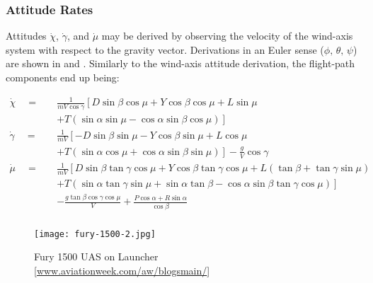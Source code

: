 \documentclass[12pt]{ucthesis}
\begin{document}
\subsubsection{Attitude Rates}
\label{subsubsec: att}
%
Attitudes $\dot{\chi}$, $\dot{\gamma}$, and $\dot{\mu}$ may be derived by observing the velocity of the wind-axis system with respect to the gravity vector. Derivations in an Euler sense ($\phi,\,\theta,\,\psi$) are shown in \citet[Pg. 222]{McRuer1973} and \citet[Sec. 1.2.3]{Duke1988}. Similarly to the wind-axis attitude derivation, the flight-path components end up being:

\begin{align*}
	\dot{\chi} \quad=\quad	& \frac{1}{mV\cos\gamma}\left[ D\sin\beta\cos\mu + Y\cos\beta\cos\mu + L\sin\mu \right.\\
	 												& +\left. T\left(\sin\alpha\sin\mu - \cos\alpha\sin\beta\cos\mu \right) \right] \\
	\dot{\gamma} \quad=\quad& \frac{1}{mV}\left[-D\sin\beta\sin\mu - Y\cos\beta\sin\mu + L\cos\mu \right.\\
														& +\left. T\left(\sin\alpha\cos\mu + \cos\alpha\sin\beta\sin\mu\right)\right] - \frac{g}{V}\cos\gamma \\
	\dot{\mu} \quad=\quad	& \frac{1}{mV}\left[D\sin\beta\tan\gamma\cos\mu + Y\cos\beta\tan\gamma\cos\mu + L\left(\tan\beta + \tan\gamma\sin\mu\right) \right.  \\
													& +\left. T\left(\sin\alpha\tan\gamma\sin\mu + \sin\alpha\tan\beta - \cos\alpha\sin\beta\tan\gamma\cos\mu\right)\right] \\
													& -\frac{g\tan\beta\cos\gamma\cos\mu}{V} + \frac{P\cos\alpha + R\sin\alpha}{\cos\beta}  \\
\end{align*}
%
\begin{figure}[H]%
	\centering%
	\texttt{[image: fury-1500-2.jpg]}%
	\caption{Fury 1500 UAS on Launcher [\href{http://www.aviationweek.com/aw/blogs/defense/index.jsp?plckController=Blog\&plckBlogPage=BlogViewPost\&newspaperUserId=27ec4a53-dcc8-42d0-bd3a-01329aef79a7\&plckPostId=Blog\%3a27ec4a53-dcc8-42d0-bd3a-01329aef79a7Post\%3ad7b30f2c-a25b-4f47-90e5-46ff5606094c\&plckScript=blogScript\&plckElementId=blogDest}{www.aviationweek.com/aw/blogsmain/}]}%
	\label{fig: fury_1500_2}%
\end{figure}%
\end{document}
